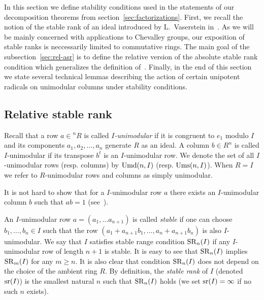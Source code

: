 In this section we define stability conditions used in the statements of our decomposition theorems from section~\ref{sec:factorizations}.
First, we recall the notion of the stable rank of an ideal introduced by L.~Vaserstein in~\cite{Va69, Va71}.
As we will be mainly concerned with applications to Chevalley groups, our exposition of stable ranks is neccessarily limited to commutative rings.
The main goal of the subsection~\ref{sec:rel-asr} is to define the relative version of the absolute stable rank condition which generalizes the definition of~\cite{EO, MKV}.
Finally, in the end of this section we state several technical lemmas describing the action of certain unipotent radicals on unimodular columns under stability conditions.

\subsection{Relative stable rank}
Recall that a row $a\in{}^n\!R$ is called \emph{$I$-unimodular} if it is congruent to $e_1$ modulo $I$ and its components $a_1,a_2,\ldots,a_n$ generate $R$ as an ideal.
A column $b \in R^n$ is called $I$-unimodular if its transpose $b^t$ is an $I$-unimodular row.
We denote the set of all $I$-unimodular rows (resp. columns) by $\operatorname{Umd}(n, I)$ (resp. $\operatorname{Ums}(n, I)$).
When $R=I$ we refer to $R$-unimodular rows and columns as simply unimodular.

It is not hard to show that for a $I$-unimodular row $a$ there exists an $I$-unimodular column $b$ such that $ab=1$ (see~\cite[\S~2]{Va69}).

An $I$-unimodular row $a=(a_1,\ldots a_{n+1})$ is called \emph{stable} if one can choose $b_1,\ldots,b_n\in I$ such that the row $(a_1+a_{n+1}b_1,\ldots,a_n+a_{n+1}b_n)$ is also $I$-unimodular. 
We say that $I$ satisfies stable range condition $\operatorname{SR}_n(I)$ if any $I$-unimodular row of length $n+1$ is stable.
It is easy to see that $\operatorname{SR}_n(I)$ implies $\operatorname{SR}_m(I)$ for any $m\geqslant n$. 
It is also clear that condition $\operatorname{SR}_n(I)$ does not depend on the choice of the ambient ring $R$.
By definition, the {\it stable rank} of $I$ (denoted $\operatorname{sr}(I)$) is the smallest natural $n$ such that $\operatorname{SR}_n(I)$ holds (we set $\operatorname{sr}(I)=\infty$ if no such $n$ exists).

